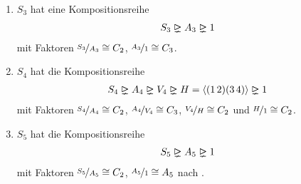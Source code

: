 \begin{example}
	\begin{enumerate}[label=(\alph*)]
		\item $S_3$ hat eine Kompositionsreihe
		\begin{align}
			S_3 \properidealright A_3 \properidealright 1 \notag
		\end{align}
		mit Faktoren $\nicefrac{S_3}{A_3} \cong C_2$, $\nicefrac{A_3}{1} \cong C_3$.
		\item $S_4$ hat die Kompositionsreihe
		\begin{align}
			S_4 \properidealright A_4 \properidealright V_4 \properidealright H=\langle (1\, 2)(3\, 4)\rangle \properidealright 1 \notag
		\end{align}
		mit Faktoren $\nicefrac{S_4}{A_4} \cong C_2$, $\nicefrac{A_4}{V_4} \cong C_3$, $\nicefrac{V_4}{H} \cong C_2$ und $\nicefrac{H}{1}\cong C_2$.
		\item $S_5$ hat die Kompositionsreihe
		\begin{align}
			S_5 \properidealright A_5 \properidealright 1\notag
		\end{align}
		mit Faktoren $\nicefrac{S_5}{A_5} \cong C_2$, $\nicefrac{A_5}{1} \cong A_5$ nach .
	\end{enumerate}
\end{example}

